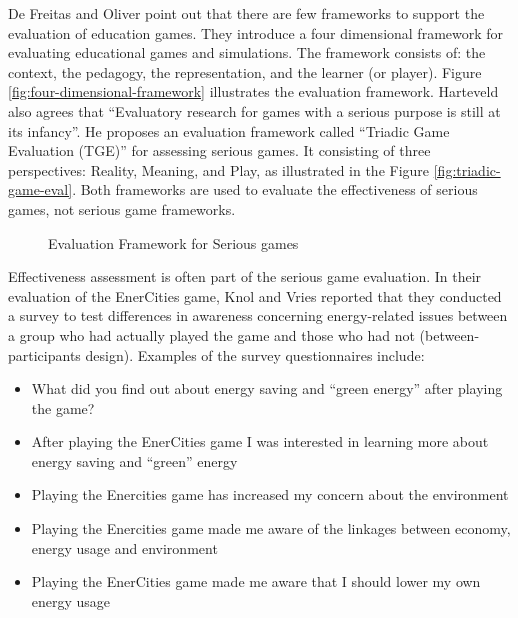 De Freitas and Oliver \cite{de2006can} point out that there are few frameworks to support the evaluation of education games. They introduce a four dimensional framework for evaluating 
educational games and simulations. The framework consists of: the context, the pedagogy, the representation, and the learner (or player). Figure \autoref{fig:four-dimensional-framework} illustrates the evaluation framework. Harteveld \cite{harteveld2010triadic} also agrees that ``Evaluatory research for games with a serious purpose is still at its infancy''. He proposes an evaluation framework called ``Triadic Game Evaluation (TGE)'' for assessing serious games. It consisting of three perspectives: Reality,
Meaning, and Play, as illustrated in the Figure \autoref{fig:triadic-game-eval}. Both frameworks are used to evaluate the effectiveness of serious games, not serious game frameworks.

\begin{figure}[ht!]
	\centering
		\caption{Evaluation Framework for Serious games}
\end{figure}

Effectiveness assessment is often part of the serious game evaluation. In their evaluation of the EnerCities game, Knol and Vries reported that they conducted a survey to test differences in awareness concerning energy-related issues between a group who had actually played the game and those who had not (between-participants design). Examples of the survey questionnaires include:
\begin{itemize}
\item What did you find out about energy saving and ``green energy'' after playing the game?
\item After playing the EnerCities game I was interested in learning more about energy saving and ``green'' energy
\item Playing the Enercities game has increased my concern about the environment
\item Playing the Enercities game made me aware of the linkages between economy, energy usage and environment
\item Playing the EnerCities game made me aware that I should lower my own energy usage
\end{itemize}

